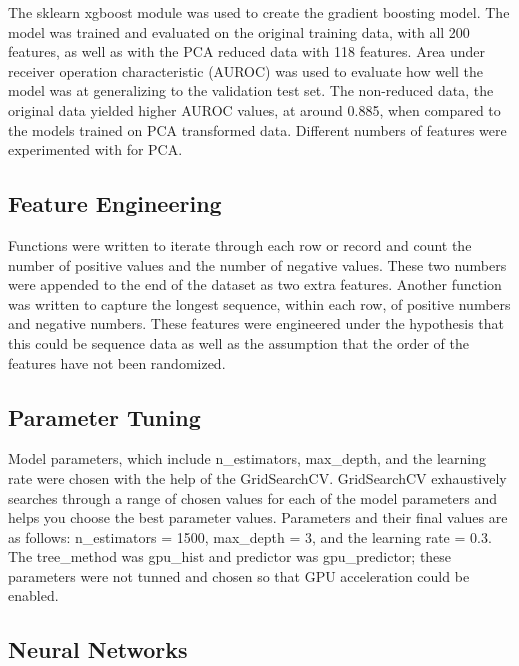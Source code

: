 \documentclass[11pt,letterpaper]{article}
\begin{document}

The sklearn xgboost module was used to create the gradient boosting model. The
model was trained and evaluated on the original training data, with all 200
features, as well as with the PCA reduced data with 118 features.  Area under
receiver operation characteristic (AUROC) was used to evaluate how well the
model was at generalizing to the validation test set.  The non-reduced data, the
original data yielded higher AUROC values, at around 0.885, when compared to the
models trained on PCA transformed data.  Different numbers of features were
experimented with for PCA. 

\subsection{Feature Engineering}

Functions were written to iterate through each row or record and count the
number of positive values and the number of negative values.  These two numbers
were appended to the end of the dataset as two extra features.  Another function
was written to capture the longest sequence, within each row, of positive
numbers and negative numbers.  These features were engineered under the
hypothesis that this could be sequence data as well as the  assumption that the
order of the features have not been randomized. 

\subsection{Parameter Tuning}

Model parameters, which include n\_estimators, max\_depth, and the learning rate
were chosen with the help of the GridSearchCV.  GridSearchCV exhaustively
searches through a range of chosen values for each of the model parameters and
helps you choose the best parameter values.  Parameters and their final values
are as follows: n\_estimators = 1500, max\_depth = 3, and the learning rate =
0.3. The tree\_method was gpu\_hist and predictor was gpu\_predictor; these
parameters were not tunned and chosen so that GPU acceleration could be
enabled.   

\iffalse
\subsection{Neural Networks}
\end{document}
